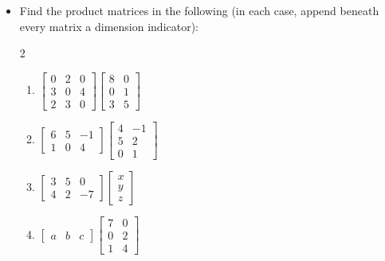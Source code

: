 \begin{itemize}
\item[4.] Find the product matrices in the following (in each case, append beneath every matrix a dimension indicator): 
\begin{multicols}{2}
\begin{enumerate}\renewcommand{\labelenumi}{\alph{enumi})}
\item [(a)] $\left[\begin{array}{lll}0 & 2 & 0 \\ 3 & 0 & 4 \\ 2 & 3 & 0\end{array}\right]\left[\begin{array}{ll}8 & 0 \\ 0 & 1 \\ 3 & 5\end{array}\right]$
\item [(b)] $\left[\begin{array}{rrr}6 & 5 & -1 \\ 1 & 0 & 4\end{array}\right]\left[\begin{array}{rr}4 & -1 \\ 5 & 2 \\ 0 & 1\end{array}\right]$
\item [(c)] $\left[\begin{array}{rrr}3 & 5 & 0 \\ 4 & 2 & -7\end{array}\right]\left[\begin{array}{l}x \\ y \\ z\end{array}\right]$
\item [(d)] $\left[\begin{array}{lll}a & b & c\end{array}\right]\left[\begin{array}{ll}7 & 0 \\ 0 & 2 \\ 1 & 4\end{array}\right]$ 
\end{enumerate}
\end{multicols}
\end{itemize}

